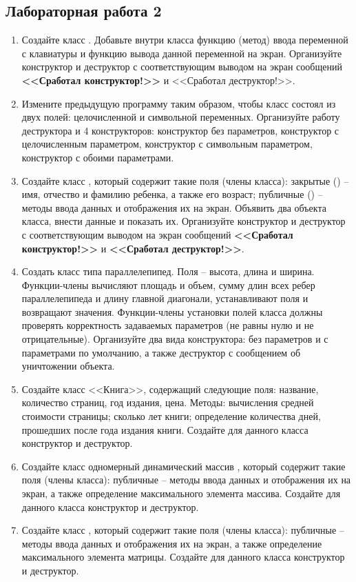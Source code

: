 \subsection{Лабораторная работа 2}
\begin{enumerate}[leftmargin=*]
    \item Создайте класс . Добавьте внутри класса функцию (метод) ввода переменной с клавиатуры и функцию вывода данной переменной на экран. Организуйте конструктор и деструктор с соответствующим выводом на экран сообщений \textbf{<<Сработал конструктор!>>} и <<Сработал деструктор!>>.
    \item Измените предыдущую программу таким образом, чтобы класс  состоял из двух полей: целочисленной и символьной переменных. Организуйте работу деструктора и 4 конструкторов: конструктор без параметров, конструктор с целочисленным параметром, конструктор с символьным параметром, конструктор с обоими параметрами. 
    \item Создайте класс , который содержит такие поля (члены класса): закрытые () – имя, отчество и фамилию ребенка, а также его возраст; публичные () – методы ввода данных и отображения их на экран. Объявить два объекта класса, внести данные и показать их. Организуйте конструктор и деструктор с соответствующим выводом на экран сообщений \textbf{<<Сработал конструктор!>>} и \textbf{<<Сработал деструктор!>>}.
    \item Создать класс типа параллелепипед. Поля – высота, длина и ширина. Функции-члены вычисляют площадь и объем, сумму длин всех ребер параллелепипеда и длину главной диагонали, устанавливают поля и возвращают значения. Функции-члены установки полей класса должны проверять корректность задаваемых параметров (не равны нулю и не отрицательные). Организуйте два вида конструктора: без параметров и с параметрами по умолчанию, а также деструктор с сообщением об уничтожении объекта.
    \item Создайте класс <<Книга>>, содержащий следующие поля: название, количество страниц, год издания, цена. Методы: вычисления средней стоимости страницы; сколько лет книги; определение количества дней, прошедших после года издания книги. Создайте для данного класса конструктор и деструктор.
    \item Создайте класс одномерный динамический массив , который содержит такие поля (члены класса): публичные – методы ввода данных и отображения их на экран, а также определение максимального элемента массива. Создайте для данного класса конструктор и деструктор.
    \item Создайте класс , который содержит такие поля (члены класса): публичные – методы ввода данных и отображения их на экран, а также определение максимального элемента матрицы. Создайте для данного класса конструктор и деструктор.
\end{enumerate}
